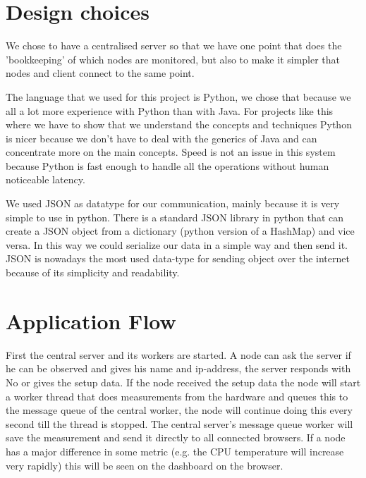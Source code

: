 \documentclass{article}
\begin{document}
\section{Design choices}
    We chose to have a centralised server so that we have one point that does the 'bookkeeping' of which nodes are monitored, but also to make it simpler that nodes and client connect to the same point.
    
    The language that we used for this project is Python, we chose that because we all a lot more experience with Python than with Java. For projects like this where we have to show that we understand the concepts and techniques Python is nicer because we don't have to deal with the generics of Java and can concentrate more on the main concepts. Speed is not an issue in this system because Python is fast enough to handle all the operations without human noticeable latency.
    
    We used JSON as datatype for our communication, mainly because it is very simple to use in python. There is a standard JSON library in python that can create a JSON object from a dictionary (python version of a HashMap) and vice versa.
    In this way we could serialize our data in a simple way and then send it.
    JSON is nowadays the most used data-type for sending object over the internet because of its simplicity and readability. %
    
\section{Application Flow}
    First the central server and its workers are started. A node can ask the server if he can be observed and gives his name and ip-address, the server responds with No or gives the setup data. If the node received the setup data the node will start a worker thread that does measurements from the hardware and queues this to the message queue of the central worker, the node will continue doing this every second till the thread is stopped. The central server's message queue worker will save the measurement and send it directly to all connected browsers. If a node has a major difference in some metric (e.g. the CPU temperature will increase very rapidly) this will be seen on the dashboard on the browser. %
    
\end{document}
